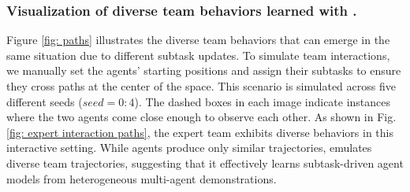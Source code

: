 \subsubsection{Visualization of diverse team behaviors learned with \ouralg.}

Figure \ref{fig: paths} illustrates the diverse team behaviors that can emerge in the same situation due to different subtask updates. To simulate team interactions, we manually set the agents' starting positions and assign their subtasks to ensure they cross paths at the center of the space. 
This scenario is simulated across five different seeds ($seed=0:4$). The dashed boxes in each image indicate instances where the two agents come close enough to observe each other.  As shown in Fig. \ref{fig: expert interaction paths}, the expert team exhibits diverse behaviors in this interactive setting. While \maogail agents produce only similar trajectories, \ouralg emulates diverse team trajectories, suggesting that it effectively learns subtask-driven agent models from heterogeneous multi-agent demonstrations.




